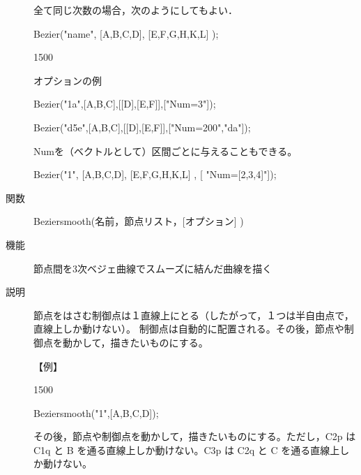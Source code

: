 \documentclass[papersize,a4paper,12pt,uplatex]{jsarticle}
\begin{document}
\begin{description}
全て同じ次数の場合，次のようにしてもよい．

Bezier("name", [A,B,C,D], [E,F,G,H,K,L] );   

\begin{layer}{150}{0}
\end{layer}

\vspace{30mm}

オプションの例

Bezier("1a",[A,B,C],[[D],[E,F]],["Num=3"]);

\hspace{20mm}

Bezier("d5e",[A,B,C],[[D],[E,F]],["Num=200","da"]);

\hspace{20mm}

Numを（ベクトルとして）区間ごとに与えることもできる。

Bezier("1", [A,B,C,D], [E,F,G,H,K,L] , [ "Num=[2,3,4]"]);  

\hspace{10mm} 


\vspace{\baselineskip}
\hypertarget{beziersmooth}{}
\item[関数]  Beziersmooth(名前，節点リスト，[オプション] )
\item[機能]  節点間を3次ベジェ曲線でスムーズに結んだ曲線を描く
\item[説明]  節点をはさむ制御点は１直線上にとる（したがって，１つは半自由点で，直線上しか動けない）。
制御点は自動的に配置される。その後，節点や制御点を動かして，描きたいものにする。

\vspace{\baselineskip}
【例】

\begin{layer}{150}{0}
\end{layer}

Beziersmooth("1",[A,B,C,D]);

\vspace{20mm}
その後，節点や制御点を動かして，描きたいものにする。ただし，C2p は C1q と B を通る直線上しか動けない。C3p は C2q と C を通る直線上しか動けない。


\end{description}
\end{document}
